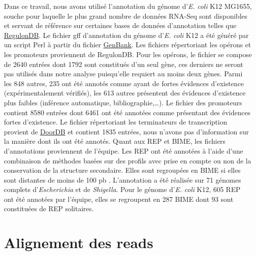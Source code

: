 \documentclass[12pt,a4paper]{report}
\begin{document}
\begin{onehalfspace}
Dans ce travail, nous avons utilisé l'annotation du génome d'\textit{E. coli} K12 MG1655, souche pour laquelle le plus grand nombre de données RNA-Seq sont disponibles et servant de référence sur certaines bases de données d'annotation telles que \href{http://regulondb.ccg.unam.mx/}{RegulonDB}.
Le fichier \gls{gff} d'annotation du génome d'\textit{E. coli} K12 a été généré par un script Perl à partir du fichier \href{http://www.ncbi.nlm.nih.gov/nuccore/NC_000913.2}{GenBank}. Les fichiers répertoriant les opérons et les promoteurs proviennent de RegulonDB. Pour les opérons, le fichier se compose de 2640 entrées dont 1792 sont constitués d'un seul gène, ces derniers ne  seront pas utilisés dans notre analyse puisqu'elle requiert au moins deux gènes. Parmi les 848 autres, 235 ont été annotés comme ayant de fortes évidences d'existence (expérimentalement vérifiés), les 613 autres présentent des évidences d'existence plus faibles (inférence automatique, bibliographie,\ldots). Le fichier des promoteurs contient 8580 entrées dont 6461 ont été annotées comme présentant des évidences fortes d'existence. Le fichier répertoriant les terminateurs de transcription provient de \href{http://csbl.bmb.uga.edu/DOOR/}{DoorDB} et contient 1835 entrées, nous n'avons pas d'information sur la manière dont ils ont été annotés. Quant aux REP et BIME, les fichiers d'annotations proviennent de l'équipe. Les REP ont été annotées à l'aide d'une combinaison de méthodes basées sur des profils avec prise en compte ou non de la conservation de la structure secondaire. Elles sont regroupées en BIME si elles sont distantes de moins de 100 pb \citep{Weyder2013}. L'annotation a été réalisée sur 71 génomes complets d'\textit{Escherichia} et de \textit{Shigella}. Pour le génome d'\textit{E. coli} K12, 605 REP ont été annotées par l'équipe, elles se regroupent en 287 BIME dont 93 sont constituées de REP solitaires.

\section*{Alignement des reads}


\end{onehalfspace}
\end{document}
